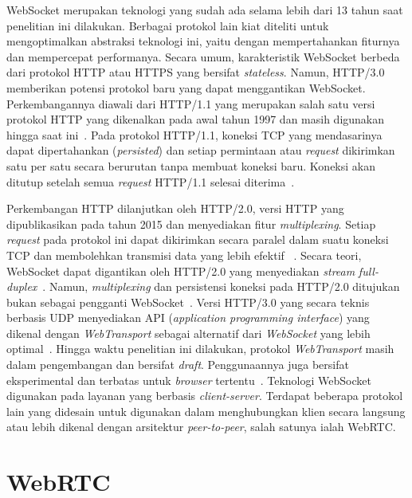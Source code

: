 WebSocket merupakan teknologi yang sudah ada selama lebih dari 13 tahun saat penelitian ini dilakukan. Berbagai protokol lain kiat diteliti untuk mengoptimalkan abstraksi teknologi ini, yaitu dengan mempertahankan fiturnya dan mempercepat performanya. Secara umum, karakteristik WebSocket berbeda dari protokol HTTP atau HTTPS yang bersifat \textit{stateless}. Namun, HTTP/3.0 memberikan potensi protokol baru yang dapat menggantikan WebSocket. Perkembangannya diawali dari HTTP/1.1 yang merupakan salah satu versi protokol HTTP yang dikenalkan pada awal tahun 1997 dan masih digunakan hingga saat ini~\citep{krishnamurthy1999key, fielding2015hypertext}. Pada protokol HTTP/1.1, koneksi TCP yang mendasarinya dapat dipertahankan (\textit{persisted}) dan setiap permintaan atau \textit{request} dikirimkan satu per satu secara berurutan tanpa membuat koneksi baru. Koneksi akan ditutup setelah semua \textit{request} HTTP/1.1 selesai diterima~\citep{fielding2015hypertext}.

Perkembangan HTTP dilanjutkan oleh HTTP/2.0, versi HTTP yang dipublikasikan pada tahun 2015 dan menyediakan fitur \textit{multiplexing}. Setiap \textit{request} pada protokol ini dapat dikirimkan secara paralel dalam suatu koneksi TCP dan membolehkan transmisi data yang lebih efektif ~\citep{belshe2015hypertext}. Secara teori, WebSocket dapat digantikan oleh HTTP/2.0 yang menyediakan \textit{stream} \textit{full-duplex}~\citep{stenberg2014http2}. Namun, \textit{multiplexing} dan persistensi koneksi pada HTTP/2.0 ditujukan bukan sebagai pengganti WebSocket~\citep{fietze2017http}. Versi HTTP/3.0 yang secara teknis berbasis UDP menyediakan API (\textit{application programming interface}) yang dikenal dengan \textit{WebTransport} sebagai alternatif dari \textit{WebSocket} yang lebih optimal~\citep{rfc9114, ietf-webtrans-http3-03}. Hingga waktu penelitian ini dilakukan, protokol \textit{WebTransport} masih dalam pengembangan dan bersifat \textit{draft}. Penggunaannya juga bersifat eksperimental dan terbatas untuk \textit{browser} tertentu~\citep{ietf-webtrans-http3-03}. Teknologi WebSocket digunakan pada layanan yang berbasis \textit{client-server}. Terdapat beberapa protokol lain yang didesain untuk digunakan dalam menghubungkan klien secara langsung atau lebih dikenal dengan arsitektur \textit{peer-to-peer}, salah satunya ialah WebRTC.


\section{WebRTC}

